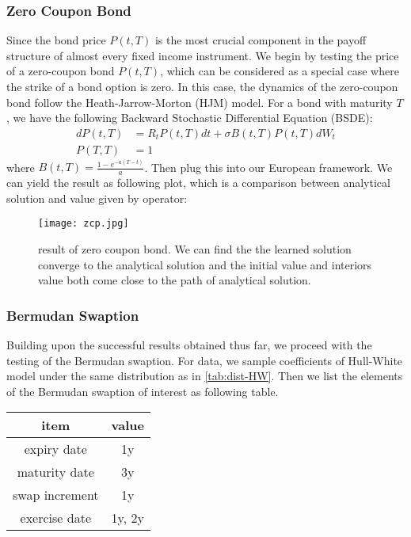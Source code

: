 \documentclass[11pt,a4paper]{article}
\theoremstyle{remark}
\begin{document}
	\subsubsection{Zero Coupon Bond}
   Since the bond price $P(t, T)$ is the most crucial component in the payoff structure of almost every fixed income instrument. We begin by testing the price of a zero-coupon bond  $P(t, T)$, which can be considered as a special case where the strike of a bond option is zero. In this case, the dynamics of the zero-coupon bond follow the Heath-Jarrow-Morton (HJM) model. For a bond with maturity $T$, we have the following Backward Stochastic Differential Equation (BSDE):
   \begin{align*}
   	d P(t, T) &= R_t P(t, T) dt + \sigma B(t, T)P(t, T) d W_t \\
   	P(T, T) &= 1
   \end{align*}
   where $	B(t, T)=\frac{1-e^{-a(T-t)}}{a}$. Then plug this into our European framework. We can yield the result as following plot, which is a comparison between analytical solution and value given by operator:
   \begin{figure}[h!]
   	\centering
   	\texttt{[image: zcp.jpg]}
   	\caption{result of zero coupon bond. We can find the the learned solution converge to the analytical solution and the initial value and interiors value both come close to the path of analytical solution.}
   	\label{fig:zcp}
   \end{figure}
	
\subsubsection{Bermudan Swaption}
	Building upon the successful results obtained thus far, we proceed with the testing of the Bermudan swaption. For data, we sample coefficients of Hull-White model under the same distribution as in \ref{tab:dist-HW}. Then we list the elements of the Bermudan swaption of interest as following table.
		\begin{table}[htbp]
		\centering
		\begin{tabular}{cc}
			\hline
			item&value  \\
			\hline
			expiry date & 1y \\
			maturity date & 3y \\
			swap increment & 1y \\
			exercise date & 1y, 2y\\
			\hline
			
		\end{tabular}
	\end{table}
	
\end{document}
